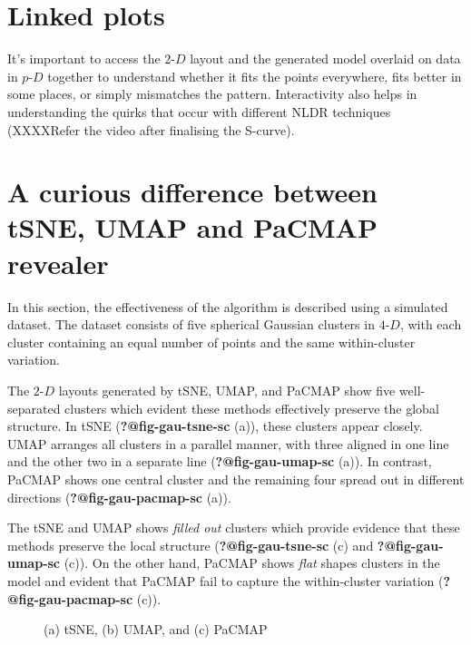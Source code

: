 \documentclass[
  12pt]{article}
\newcommand\pD{$p\text{-}D$}
\newcommand\gD{$2\text{-}D$}
\begin{document}
\section{Linked plots}\label{linked-plots}

It's important to access the \gD{} layout and the generated model
overlaid on data in \pD{} together to understand whether it fits the
points everywhere, fits better in some places, or simply mismatches the
pattern. Interactivity also helps in understanding the quirks that occur
with different NLDR techniques (XXXXRefer the video after finalising the
S-curve).

\section{A curious difference between tSNE, UMAP and PaCMAP
revealer}\label{a-curious-difference-between-tsne-umap-and-pacmap-revealer}

In this section, the effectiveness of the algorithm is described using a
simulated dataset. The dataset consists of five spherical Gaussian
clusters in \(4\text{-}D\), with each cluster containing an equal number
of points and the same within-cluster variation.

The \gD{} layouts generated by tSNE, UMAP, and PaCMAP show five
well-separated clusters which evident these methods effectively preserve
the global structure. In tSNE (\textbf{?@fig-gau-tsne-sc} (a)), these
clusters appear closely. UMAP arranges all clusters in a parallel
manner, with three aligned in one line and the other two in a separate
line (\textbf{?@fig-gau-umap-sc} (a)). In contrast, PaCMAP shows one
central cluster and the remaining four spread out in different
directions (\textbf{?@fig-gau-pacmap-sc} (a)).

The tSNE and UMAP shows \emph{filled out} clusters which provide
evidence that these methods preserve the local structure
(\textbf{?@fig-gau-tsne-sc} (c) and \textbf{?@fig-gau-umap-sc} (c)). On
the other hand, PaCMAP shows \emph{flat} shapes clusters in the model
and evident that PaCMAP fail to capture the within-cluster variation
(\textbf{?@fig-gau-pacmap-sc} (c)).

\begin{figure}


\caption{\label{fig-five-gau-projs}(a) tSNE, (b) UMAP, and (c) PaCMAP}

\end{figure}%
\end{document}

